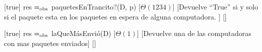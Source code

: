 \begin{Interfaz}
  [true]%
  {res $=_{\mathrm{obs}}$ paquetesEnTrancito?(D, p)}%
  [$\Theta(1234)$]%
  [Devuelve ``True'' si y solo si el paquete esta en los paquetes en espera de alguna computadora. ]%
  []%

  [true]%
  {res $=_{\mathrm{obs}}$ laQueM\'asEnvi\'o(D)}%
  [$\Theta(1)$]%
  [Devuelve una de las computadoras con mas paquetes enviados]%
  []%


\end{Interfaz}

